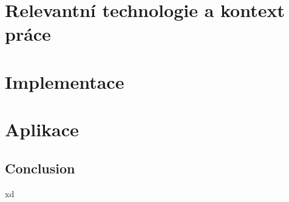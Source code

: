 \documentclass{ctuthesis}
\begin{document}
\maketitle



\part{Relevantní technologie a kontext práce}




\part{Implementace}

\part{Aplikace}

\chapter{Conclusion}

xd~\cite{key}

\printbibliography{}
\end{document}

